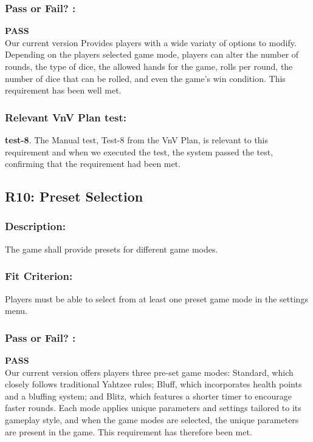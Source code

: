 \documentclass[12pt, titlepage]{article}
\begin{document}
\subsubsection*{Pass or Fail? :} 

 \noindent \textbf{PASS}\\
 
  Our current version Provides players with a wide variaty of options to modify. Depending on the players selected game mode, players can alter the number of rounds, the type of dice, the allowed hands for the game, rolls per round, the number of dice that can be rolled, and even the game's win condition. This requirement has been well met.

\subsubsection*{Relevant VnV Plan test: } \textbf{test-8}.  The Manual test, Test-8 from the VnV Plan, is relevant to this requirement and when we executed the test, the system passed the test, confirming that the requirement had been met.


\subsection{R10: Preset Selection} 
\label{R10} 

\subsubsection*{Description:}The game shall provide presets for different game modes.

\subsubsection*{Fit Criterion:}Players must be able to select from at least one preset game mode in the settings menu.

\subsubsection*{Pass or Fail? :} 

 \noindent \textbf{PASS}\\
 
  Our current version offers players three pre-set game modes: Standard, which closely follows traditional Yahtzee rules; Bluff, which incorporates health points and a bluffing system; and Blitz, which features a shorter timer to encourage faster rounds. Each mode applies unique parameters and settings tailored to its gameplay style, and when the game modes are selected, the unique parameters are present in the game. This requirement has therefore been met.
\end{document}
